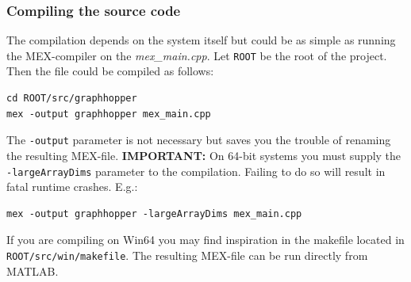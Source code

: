 \documentclass{article}
\begin{document}
\begin{appendices}
\subsubsection{Compiling the source code}
The compilation depends on the system itself but could be as simple as running the MEX-compiler on the \textit{mex\_main.cpp}. Let \verb|ROOT| be the root of the project. Then the file could be compiled as follows:
\begin{verbatim}
cd ROOT/src/graphhopper
mex -output graphhopper mex_main.cpp
\end{verbatim}
The \verb|-output| parameter is not necessary but saves you the trouble of renaming the resulting MEX-file. \textbf{IMPORTANT:} On 64-bit systems you must supply the \verb|-largeArrayDims| parameter to the compilation. Failing to do so will result in fatal runtime crashes. E.g.:
\begin{verbatim}
mex -output graphhopper -largeArrayDims mex_main.cpp
\end{verbatim}
If you are compiling on Win64 you may find inspiration in the makefile located in \verb|ROOT/src/win/makefile|. The resulting MEX-file can be run directly from MATLAB.


\end{appendices}
\end{document}
